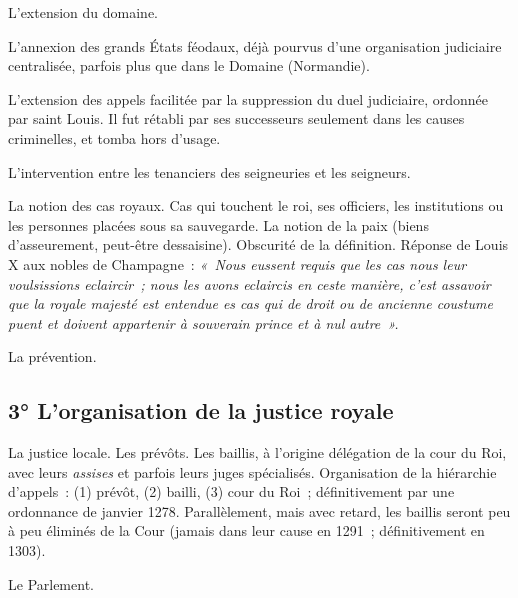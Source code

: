 \documentclass[french,twoside]{book} %
\begin{document}
\begin{listalpha}[itemsep=0pt,]
\item L’extension du domaine.
\item L’annexion des grands États féodaux, déjà pourvus d’une organisation judiciaire centralisée, parfois plus que dans le Domaine (Normandie).
\item L’extension des appels facilitée par la suppression du duel judiciaire, ordonnée par saint Louis. Il fut rétabli par ses successeurs seulement dans les causes criminelles, et tomba hors d’usage.
\item L’intervention entre les tenanciers des seigneuries et les seigneurs.
\item La notion des cas royaux. Cas qui touchent le roi, ses officiers, les institutions ou les personnes placées sous sa sauvegarde. La notion de la paix (biens d’asseurement, peut-être dessaisine). Obscurité de la définition. Réponse de Louis X aux nobles de Champagne : \emph{« Nous eussent requis que les cas nous leur voulsissions eclaircir ; nous les avons eclaircis en ceste manière, c’est assavoir que la royale majesté est entendue es cas qui de droit ou de ancienne coustume puent et doivent appartenir à souverain prince et à nul autre ».} 
\item La prévention.
\end{listalpha}

\subsection[{3° L’organisation de la justice royale}]{3° L’organisation de la justice royale}

\begin{listalpha}[itemsep=0pt,]
\item La justice locale. Les prévôts. Les baillis, à l’origine délégation de la cour du Roi, avec leurs \emph{assises} et parfois leurs juges spécialisés. Organisation de la hiérarchie d’appels : (1) prévôt, (2) bailli, (3) cour du Roi ; définitivement par une ordonnance de janvier 1278. Parallèlement, mais avec retard, les baillis seront peu à peu éliminés de la Cour (jamais dans leur cause en 1291 ; définitivement en 1303).
\item Le Parlement.
\end{listalpha}
\end{document}

